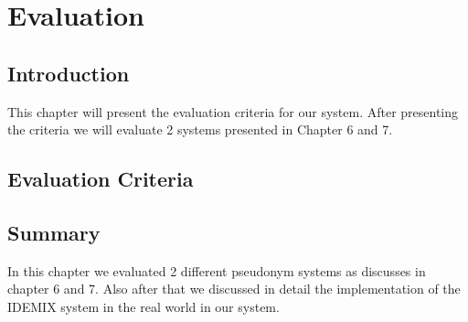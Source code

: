 \chapter{Evaluation}
\section{Introduction}
This chapter will present the evaluation criteria for our system. After presenting the criteria we will evaluate 2 systems presented in Chapter 6 and 7.
\section{Evaluation Criteria}
\section{Summary}
In this chapter we evaluated 2 different pseudonym systems as discusses in chapter 6 and 7. Also after that we discussed in detail the implementation of the IDEMIX system in the real world in our system.
